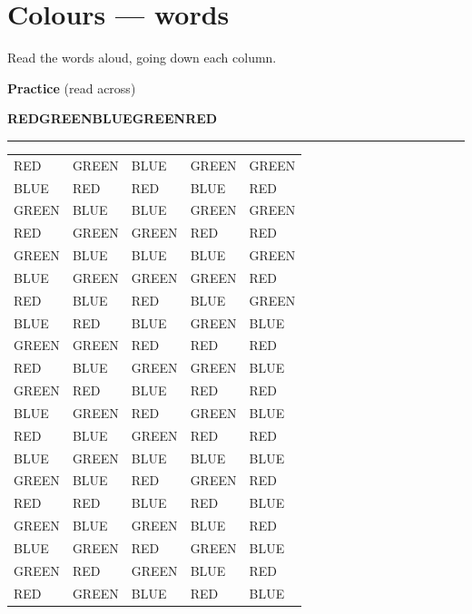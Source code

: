 \documentclass[12pt,a4paper]{article}
\begin{document}
\section*{Colours --- words}{\large Read the words aloud, going down each column.}
\par\medskip\textbf{Practice} (read across)\begin{center}\sffamily\Large\bfseries RED\qquad GREEN\qquad BLUE\qquad GREEN\qquad RED\end{center}\vspace{-4pt}\hrule\vspace{4pt}
\begin{center}\sffamily\Large\bfseries\begin{tabular}{@{}*{5}{p{2.6cm}<{\centering}}@{}}
RED & GREEN & BLUE & GREEN & GREEN\\[3pt]
BLUE & RED & RED & BLUE & RED\\[3pt]
GREEN & BLUE & BLUE & GREEN & GREEN\\[3pt]
RED & GREEN & GREEN & RED & RED\\[3pt]
GREEN & BLUE & BLUE & BLUE & GREEN\\[3pt]
BLUE & GREEN & GREEN & GREEN & RED\\[3pt]
RED & BLUE & RED & BLUE & GREEN\\[3pt]
BLUE & RED & BLUE & GREEN & BLUE\\[3pt]
GREEN & GREEN & RED & RED & RED\\[3pt]
RED & BLUE & GREEN & GREEN & BLUE\\[3pt]
GREEN & RED & BLUE & RED & RED\\[3pt]
BLUE & GREEN & RED & GREEN & BLUE\\[3pt]
RED & BLUE & GREEN & RED & RED\\[3pt]
BLUE & GREEN & BLUE & BLUE & BLUE\\[3pt]
GREEN & BLUE & RED & GREEN & RED\\[3pt]
RED & RED & BLUE & RED & BLUE\\[3pt]
GREEN & BLUE & GREEN & BLUE & RED\\[3pt]
BLUE & GREEN & RED & GREEN & BLUE\\[3pt]
GREEN & RED & GREEN & BLUE & RED\\[3pt]
RED & GREEN & BLUE & RED & BLUE\\[3pt]
\end{tabular}\end{center}\clearpage
\end{document}

